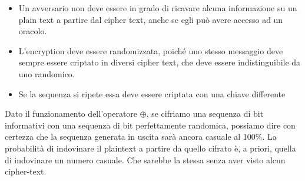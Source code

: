 \begin{itemize}
    \item Un avversario non deve essere in grado di ricavare alcuna informazione su un plain text a partire dal cipher text, anche se egli può avere accesso ad un oracolo.  
    \item L’encryption deve essere randomizzata, poiché uno stesso messaggio deve sempre essere criptato in diversi cipher text, che deve essere indistinguibile da uno randomico. 
    \item Se la sequenza si ripete essa deve essere criptata con una chiave differente
\end{itemize}
\begin{corollary}
Dato il funzionamento dell'operatore $\oplus$, se cifriamo una sequenza di bit informativi con una sequenza di bit perfettamente randomica, possiamo dire con certezza che la sequenza generata in uscita sarà ancora casuale al 100\%. La probabilità di indovinare il plaintext a partire da quello cifrato è, a priori, quella di indovinare un numero casuale. Che sarebbe la stessa senza aver visto alcun cipher-text.
\end{corollary}
